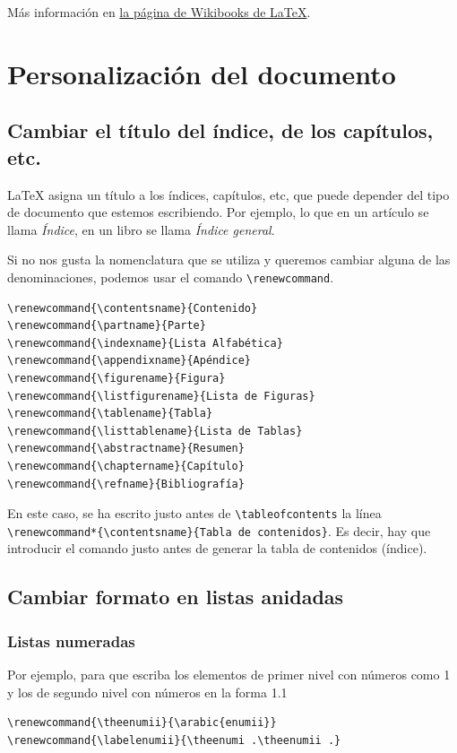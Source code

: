 \documentclass[12pt,a4paper, oneside]{report}
\begin{document}
Más información en \href{http://en.wikibooks.org/wiki/LaTeX/Hyperlinks}{la página de Wikibooks de \LaTeX}.


\chapter{Personalización del documento}

\section{Cambiar el título del índice, de los capítulos, etc.}

\LaTeX{} asigna un título a los índices, capítulos, etc, que puede depender del tipo de documento que estemos escribiendo. Por ejemplo, lo que en un artículo se llama \emph{Índice}, en un libro se llama \emph{Índice general}. 

Si no nos gusta la nomenclatura que se utiliza y queremos cambiar alguna de las denominaciones, podemos usar el comando \verb+\renewcommand+.


\begin{verbatim}
\renewcommand{\contentsname}{Contenido}
\renewcommand{\partname}{Parte}
\renewcommand{\indexname}{Lista Alfabética}
\renewcommand{\appendixname}{Apéndice}
\renewcommand{\figurename}{Figura}
\renewcommand{\listfigurename}{Lista de Figuras}
\renewcommand{\tablename}{Tabla}
\renewcommand{\listtablename}{Lista de Tablas}
\renewcommand{\abstractname}{Resumen}
\renewcommand{\chaptername}{Capítulo}
\renewcommand{\refname}{Bibliografía}
\end{verbatim}

En este caso, se ha escrito  justo antes de \verb+\tableofcontents+ la línea \verb+\renewcommand*{\contentsname}{Tabla de contenidos}+. Es decir, hay que introducir el comando justo antes de generar la tabla de contenidos (índice).

\section{Cambiar formato en listas anidadas}

\subsection{Listas numeradas}
Por ejemplo, para que escriba los elementos de primer nivel con números como 1 y los de segundo nivel con números en la forma 1.1

\begin{verbatim}
\renewcommand{\theenumii}{\arabic{enumii}}
\renewcommand{\labelenumii}{\theenumi .\theenumii .}
\end{verbatim}
\end{document}

